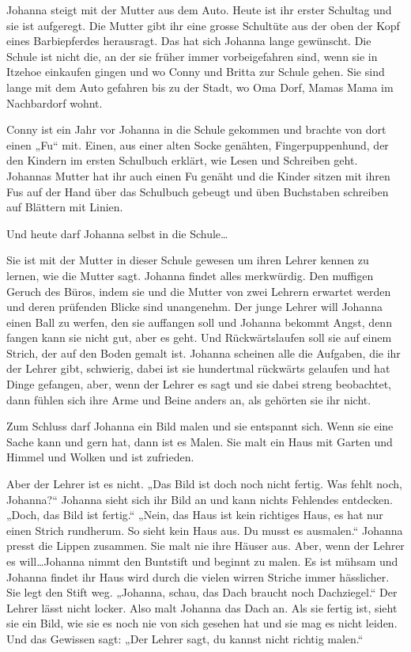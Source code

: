 \documentclass[10pt,titlepage,a5paper]{book}
\begin{document}
Johanna steigt mit der Mutter aus dem Auto. Heute ist ihr erster Schultag und sie ist aufgeregt. Die Mutter gibt ihr eine grosse Schultüte aus der oben der Kopf eines Barbiepferdes herausragt. Das hat sich Johanna lange gewünscht. Die Schule ist nicht die, an der sie früher immer vorbeigefahren sind, wenn sie in Itzehoe einkaufen gingen und wo Conny und Britta zur Schule gehen. Sie sind lange mit dem Auto gefahren bis zu der Stadt, wo Oma Dorf, Mamas Mama im Nachbardorf wohnt.

Conny ist ein Jahr vor Johanna in die Schule gekommen und brachte von dort einen „Fu“ mit. Einen, aus einer alten Socke genähten, Fingerpuppenhund, der den Kindern im ersten Schulbuch erklärt, wie Lesen und Schreiben geht. Johannas Mutter hat ihr auch einen Fu genäht und die Kinder sitzen mit ihren Fus auf der Hand über das Schulbuch gebeugt und üben Buchstaben schreiben auf Blättern mit Linien.

Und heute darf Johanna selbst in die Schule\dots

Sie ist mit der Mutter in dieser Schule gewesen um ihren Lehrer kennen zu lernen, wie die Mutter sagt. Johanna findet alles merkwürdig. Den muffigen Geruch des Büros, indem sie und die Mutter von zwei Lehrern erwartet werden und deren prüfenden Blicke sind unangenehm. Der junge Lehrer will Johanna einen Ball zu werfen, den sie auffangen soll und Johanna bekommt Angst, denn fangen kann sie nicht gut, aber es geht. Und Rückwärtslaufen soll sie auf einem Strich, der auf den Boden gemalt ist. Johanna scheinen alle die Aufgaben, die ihr der Lehrer gibt, schwierig, dabei ist sie hundertmal rückwärts gelaufen und hat Dinge gefangen, aber, wenn der Lehrer es sagt und sie dabei streng beobachtet, dann fühlen sich ihre Arme und Beine anders an, als gehörten sie ihr nicht.

Zum Schluss darf Johanna ein Bild malen und sie entspannt sich. Wenn sie eine Sache kann und gern hat, dann ist es Malen. Sie malt ein Haus mit Garten und Himmel und Wolken und ist zufrieden. 

Aber der Lehrer ist es nicht. „Das Bild ist doch noch nicht fertig. Was fehlt noch, Johanna?“  Johanna sieht sich ihr Bild an und kann nichts Fehlendes entdecken. „Doch, das Bild ist fertig.“ „Nein, das Haus ist kein richtiges Haus, es hat nur einen Strich rundherum. So sieht kein Haus aus. Du musst es ausmalen.“ Johanna presst die Lippen zusammen. Sie malt nie ihre Häuser aus. Aber, wenn der Lehrer es will\dots Johanna nimmt den Buntstift und beginnt zu malen. Es ist mühsam und Johanna findet ihr Haus wird durch die vielen wirren Striche immer hässlicher. Sie legt den Stift weg. „Johanna, schau, das Dach braucht noch Dachziegel.“ Der Lehrer lässt nicht locker. Also malt Johanna das Dach an. Als sie fertig ist, sieht sie ein Bild, wie sie es noch nie von sich gesehen hat und sie mag es nicht leiden. Und das Gewissen sagt: „Der Lehrer sagt, du kannst nicht richtig malen.“
\end{document}
